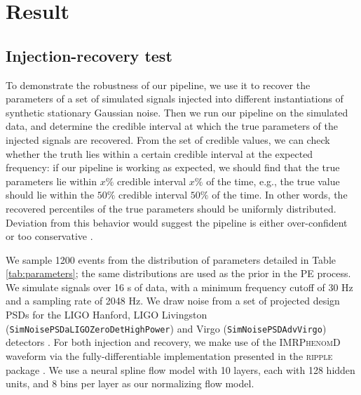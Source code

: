 \documentclass[twocolumn]{aastex631}
\begin{document}
\section{Result}
\label{sec: Result}
\subsection{Injection-recovery test}

To demonstrate the robustness of our pipeline, we use it to recover the
parameters of a set of simulated signals injected into different instantiations
of synthetic stationary Gaussian noise. Then we run our pipeline on the
simulated data, and determine the credible interval at which the true
parameters of the injected signals are recovered. From the set of credible
values, we can check whether the truth lies within a certain credible interval
at the expected frequency: if our pipeline is working as expected, we should
find that the true parameters lie within $x\%$ credible interval $x\%$ of the
time, e.g., the true value should lie within the $50\%$ credible interval
$50\%$ of the time. In other words, the recovered percentiles of the true
parameters should be uniformly distributed. Deviation from this behavior would
suggest the pipeline is either over-confident or too conservative
\cite{Cook2006,Talts2018}.

We sample 1200 events from the distribution of parameters detailed in Table
\ref{tab:parameters}; the same distributions are used as the prior in the PE
process.  We simulate signals over 16 s of data, with a minimum frequency
cutoff of 30 Hz and a sampling rate of 2048 Hz. We draw noise from a set of
projected design PSDs for the LIGO Hanford, LIGO Livingston
(\texttt{SimNoisePSDaLIGOZeroDetHighPower}) and Virgo
(\texttt{SimNoisePSDAdvVirgo}) detectors
\cite{lalsuite,Shoemaker:T0900288,2012arXiv1202.4031M}. For both injection and
recovery, we make use of the \textsc{IMRPhenomD} waveform \cite{Khan:2015jqa}
via the fully-differentiable implementation presented in the \textsc{ripple}
package \cite{ripplepaper}. We use a neural spline flow model \cite{2019arXiv190604032D}
with 10 layers, each with 128 hidden units, and 8 bins per layer as our
normalizing flow model.
\end{document}
